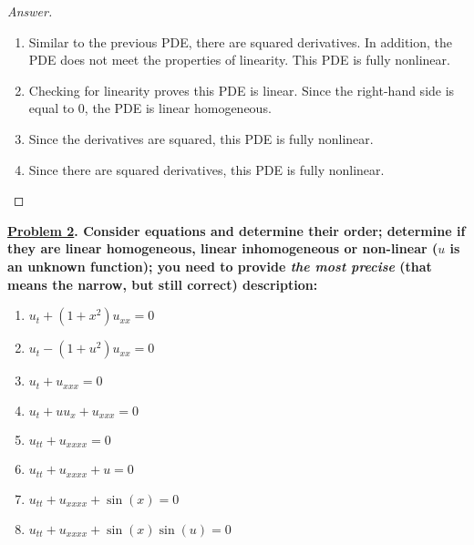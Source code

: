 \documentclass{article}
\theoremstyle{definition}
\renewcommand\qedsymbol{$\blacksquare$}
\newenvironment{ans}{\begin{proof}[Answer]\renewcommand{\qedsymbol}{}}{\end{proof}}
\newenvironment{boldenv}{\bfseries\boldmath}{}
\begin{document}
\begin{ans}
\begin{enumerate}[(1), series=answers]
			\item Similar to the previous PDE, there are squared derivatives. In addition, the PDE does not meet the properties of linearity. This PDE is fully nonlinear.
			
			\item Checking for linearity proves this PDE is linear. Since the right-hand side is equal to 0, the PDE is linear homogeneous.
			
			\item Since the derivatives are squared, this PDE is fully nonlinear.
			
			\item Since there are squared derivatives, this PDE is fully nonlinear.
		\end{enumerate}
		
	\end{ans}
	\begin{boldenv}
		\underline{Problem 2}. Consider equations and determine their order; determine if they are linear homogeneous, linear inhomogeneous or non-linear ($u$ is an unknown function); you need to provide \textit{the most precise} (that means the narrow, but still correct) description:
		\begin{enumerate}[resume*=problems]
			\item $u_t + (1+x^2)u_{xx} = 0$
			\item $u_t - (1 + u^2)u_{xx} = 0$
			\item $u_t + u_{xxx} = 0$
			\item $u_t + uu_x + u_{xxx} = 0$
			\item $u_{tt} + u_{xxxx} = 0$
			\item $u_{tt} + u_{xxxx} + u = 0$
			\item $u_{tt} + u_{xxxx} + \sin{(x)} = 0$
			\item $u_{tt} + u_{xxxx} + \sin{(x)}\sin{(u)} = 0$
		\end{enumerate}
	\end{boldenv}
	
\end{document}
